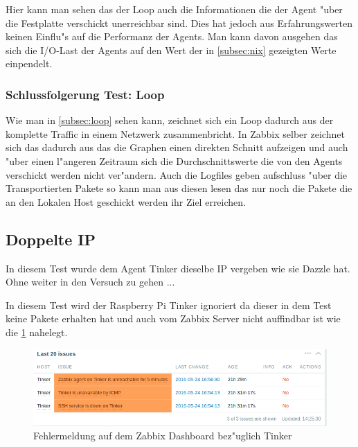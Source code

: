 Hier kann man sehen das der Loop auch die Informationen die der Agent "uber die Festplatte verschickt unerreichbar sind. Dies hat jedoch aus Erfahrungswerten keinen Einflu"s auf die %
Performanz der Agents. Man kann davon ausgehen das sich die I/O-Last der Agents auf den Wert der in \cref{subsec:nix} gezeigten Werte einpendelt. %


\subsubsection{Schlussfolgerung Test: Loop}
\label{subsubsec:schlussfolgerung:loop}

Wie man in \cref{subsec:loop} sehen kann, zeichnet sich ein Loop dadurch aus der komplette Traffic in einem Netzwerk zusammenbricht. In Zabbix selber zeichnet sich das %
dadurch aus das die Graphen einen direkten Schnitt aufzeigen und auch "uber einen l"angeren Zeitraum sich die Durchschnittswerte die von den Agents verschickt werden nicht %
ver"andern. Auch die Logfiles geben aufschluss "uber die Transportierten Pakete so kann man aus diesen lesen das nur noch die Pakete die an den Lokalen Host geschickt werden %
ihr Ziel erreichen.  


\subsection{Doppelte IP}

In diesem Test wurde dem Agent Tinker dieselbe IP vergeben wie sie Dazzle hat. Ohne weiter in den Versuch zu gehen ...

In diesem Test wird der Raspberry Pi Tinker ignoriert da dieser in dem Test keine Pakete erhalten hat und auch vom %
Zabbix Server nicht auffindbar ist wie die \cref{fig:fehlermeldungenTinker} nahelegt.

\begin{figure}[htbp]
\centering
\includegraphics*[width=0.9\linewidth]{Abb/ZabbixTinker/DoppelteIP/TinkerFaults}

\caption{Fehlermeldung auf dem Zabbix Dashboard bez"uglich Tinker}
\label{fig:fehlermeldungenTinker}
\end{figure}

